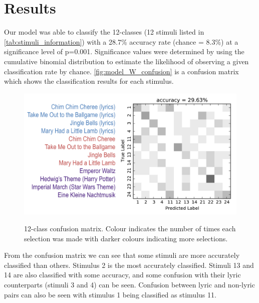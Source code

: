 \section*{Results}
Our model was able to classify the 12-classes (12 stimuli listed in \autoref{tab:stimuli_information}) with a 28.7\% accuracy rate (chance = 8.3\%) at a significance level of p=0.001. 
Significance values were determined by using the cumulative binomial distribution to estimate the likelihood of observing a given classification rate by chance. 
\autoref{fig:model_W_confusion} is a confusion matrix which shows the classification results for each stimulus.

\begin{figure}[h] 
  \begin{center}
    \includegraphics[width=.75\textwidth,keepaspectratio=true]{Figures/model_W_confusion}
   \\\vspace{-0.8em}
    \caption{12-class confusion matrix. Colour indicates the number of times each selection was made with darker colours indicating more selections.}
    \label{fig:model_W_confusion}
  \end{center}
\end{figure}

From the confusion matrix we can see that some stimuli are more accurately classified than others. 
Stimulus 2 is the most accurately classified. 
Stimuli 13 and 14 are also classified with some accuracy, and some confusion with their lyric counterparts (stimuli 3 and 4) can be seen.
Confusion between lyric and non-lyric pairs can also be seen with stimulus 1 being classified as stimulus 11.

